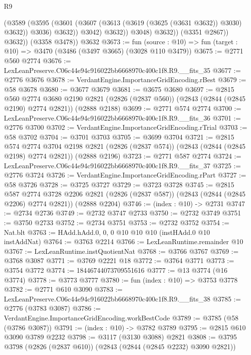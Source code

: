 \begin{lexlean}{R9}
\begin{coremodule}
                        (@3589
                          (@3595
                            (@3601 (@3607 (@3613 (@3619 (@3625 (@3631 @3632)) @3030) @3632)) @3036)
                            @3632))
                        @3042)
                      @3632))
                  @3048)
                @3632))
            (@3351 @2867))
          @3632))
      (@3358 @3478))
    @3632
@3673 := fun (source : @10) => fun (target : @10) => @3470 (@3486 (@3497 @3665) (@3028 @110 @3479))
@3675 := @2771 @560 @2774
@3676 := LexLeanPreserve.C06c44e94c916022bb6668970c400c1f8.R9.__fits_35
@3677 := @2776 @3676
@3678 := VerdantEngine.ImportanceGridEncoding.rBest
@3679 := @58 @3678
@3680 := @3677 @3679
@3681 := @3675 @3680
@3697 := @2815
    @560
    @2774
    @3680
    @2190
    @2821
    (@2826 (@2837 @560))
    (@2843 (@2844 (@2845 @2190) @2774 @2821))
    (@2888 @2188)
@3699 := @2771 @574 @2774
@3700 := LexLeanPreserve.C06c44e94c916022bb6668970c400c1f8.R9.__fits_36
@3701 := @2776 @3700
@3702 := VerdantEngine.ImportanceGridEncoding.rTrial
@3703 := @58 @3702
@3704 := @3701 @3703
@3705 := @3699 @3704
@3721 := @2815
    @574
    @2774
    @3704
    @2198
    @2821
    (@2826 (@2837 @574))
    (@2843 (@2844 (@2845 @2198) @2774 @2821))
    (@2888 @2196)
@3723 := @2771 @587 @2774
@3724 := LexLeanPreserve.C06c44e94c916022bb6668970c400c1f8.R9.__fits_37
@3725 := @2776 @3724
@3726 := VerdantEngine.ImportanceGridEncoding.rPart
@3727 := @58 @3726
@3728 := @3725 @3727
@3729 := @3723 @3728
@3745 := @2815
    @587
    @2774
    @3728
    @2206
    @2821
    (@2826 (@2837 @587))
    (@2843 (@2844 (@2845 @2206) @2774 @2821))
    (@2888 @2204)
@3746 := (index : @10) -> @2731
@3747 := @2734 @2736
@3749 := @2732 @3747 @2733
@3750 := @2732 @3749
@3751 := @3750 @2733
@3752 := @2734 @3751
@3753 := @2732 @3752
@3754 := Nat.blt
@3763 := HAdd.hAdd.{0, 0, 0} @10 @10 @10 (instHAdd.{0} @10 instAddNat)
@3764 := @3763 @2214
@3766 := LexLeanRuntime.remainder @10
@3767 := LexLeanRuntime.instQuotientNat
@3768 := @3766 @3767
@3769 := @3768 @3087
@3771 := @3769 @2221 @18
@3772 := @3764 @3771
@3773 := @3754 @3772
@3774 := 18446744073709551616
@3777 := @13 @3774 (@16 @3774)
@3778 := @3773 @3777
@3780 := fun (index : @10) => @3753 @3778
@3782 := @2771 @610 @3090
@3783 := LexLeanPreserve.C06c44e94c916022bb6668970c400c1f8.R9.__fits_38
@3785 := @2776 (@3783 @3087)
@3786 := VerdantEngine.ImportanceGridEncoding.workBestCode
@3789 := @3785 (@58 (@3786 @3087))
@3791 := (index : @10) -> @3782 @3789
@3795 := @2815 @610 @3090 @3789 @2232
@3798 := @3117 (@3130 @3088) @2821
@3808 := @3795 @3798 (@2826 (@2837 @610)) (@2843 (@2844 (@2845 @2232) @3090 @2821))

\end{coremodule}
\end{lexlean}
